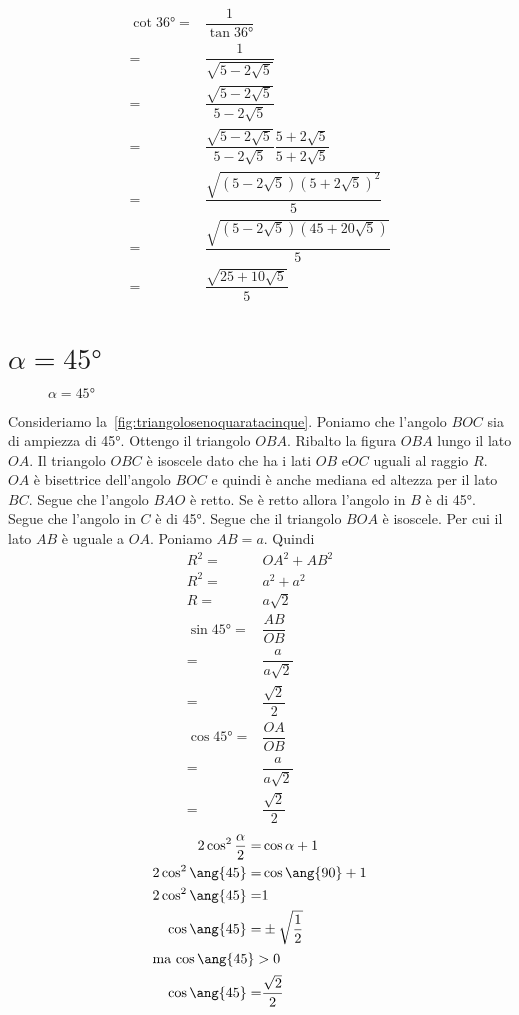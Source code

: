 \begin{align*}
	\cot\ang{36}=&\dfrac{1}{\tan\ang{36}}\\
	=&\dfrac{1}{\sqrt{5-2\sqrt{5}}}\\
	=&\dfrac{\sqrt{5-2\sqrt{5}}}{5-2\sqrt{5}}\\
	=&\dfrac{\sqrt{5-2\sqrt{5}}}{5-2\sqrt{5}}\dfrac{5+2\sqrt{5}}{5+2\sqrt{5}}\\
	=&\dfrac{\sqrt{(5-2\sqrt{5})(5+2\sqrt{5})^2}}{5}\\
	=&\dfrac{\sqrt{(5-2\sqrt{5})(45+20\sqrt{5})}}{5}\\
	=&\dfrac{\sqrt{25+10\sqrt{5}}}{5}\\
\end{align*}
\section{$\alpha=\ang{45}$}
\begin{figure}
	\centering
	
	\caption{$\alpha=\ang{45}$}
	\label{fig:triangolosenoquaratacinque}
\end{figure}
Consideriamo la~\vref{fig:triangolosenoquaratacinque}. Poniamo che l'angolo $BOC$ sia di ampiezza di \ang{45}. Ottengo il triangolo $OBA$. Ribalto la figura $OBA$ lungo il lato $OA$. Il triangolo $OBC$ è isoscele dato che ha i lati $OB$ e$OC$ uguali al raggio $R$. $OA$ è bisettrice dell'angolo $BOC$ e quindi è anche mediana ed altezza per il lato $BC$. Segue che l'angolo $BAO$ è retto. Se è retto allora l'angolo in $B$ è di \ang{45}. Segue che l'angolo in $C$ è di \ang{45}. Segue che il triangolo $BOA$ è isoscele. Per cui il lato $AB$ è uguale a $OA$. Poniamo $AB=a$. Quindi
\begin{align*}
	R^2=&OA^2+AB^2\\
	R^2=&a^2+a^2\\
	R=&a\sqrt{2}\\
	\sin\ang{45}=&\dfrac{AB}{OB}\\
	=&\dfrac{a}{a\sqrt{2}}\\
	=&\dfrac{\sqrt{2}}{2}\\
	\cos\ang{45}=&\dfrac{OA}{OB}\\
	=&\dfrac{a}{a\sqrt{2}}\\
	=&\dfrac{\sqrt{2}}{2}
\end{align*} 
\begin{align*}
	2\cos^2\dfrac{\alpha}{2}=&\cos\alpha+1\\
	2\cos^2\ang{45}=&\cos\ang{90}+1\\
	2\cos^2\ang{45}=&1\\
	\cos\ang{45}=&\pm\sqrt{\dfrac{1}{2}}\\
	\intertext{ma $\cos\ang{45}>0$}
	\cos\ang{45}=&\dfrac{\sqrt{2}}{2}\\
\end{align*}
